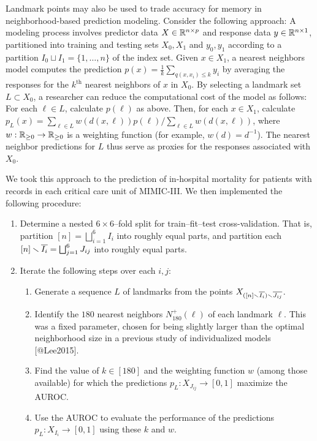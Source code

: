 \documentclass[
]{article}
\providecommand{\tightlist}{%
  \setlength{\itemsep}{0pt}\setlength{\parskip}{0pt}}
\begin{document}
Landmark points may also be used to trade accuracy for memory in
neighborhood-based prediction modeling. Consider the following approach:
A modeling process involves predictor data \(X \in \mathbb{R}^{n \times p}\) and
response data \(y \in \mathbb{R}^{n \times 1}\), partitioned into training and
testing sets \(X_0,X_1\) and \(y_0,y_1\) according to a partition
\(I_0 \sqcup I_1 = \{1,\ldots,n\}\) of the index set. Given
\(x \in X_1\), a nearest neighbors model computes the prediction
\(p(x) = \frac{1}{k}\sum_{q(x,x_i) \leq k}{y_i}\) by averaging the
responses for the \(k^\text{th}\) nearest neighbors of \(x\) in \(X_0\).
By selecting a landmark set \(L \subset X_0\), a researcher can reduce
the computational cost of the model as follows: For each \(\ell \in L\),
calculate \(p(\ell)\) as above. Then, for each \(x \in X_1\), calculate
\(p_L(x) = \sum_{\ell \in L}{w(d(x,\ell)) p(\ell)} / \sum_{\ell \in L}{w(d(x,\ell))}\),
where \(w : \mathbb{R}_{\geq 0} \to \mathbb{R}_{\geq 0}\) is a weighting function (for
example, \(w(d)=d^{-1}\)). The nearest neighbor predictions for \(L\)
thus serve as proxies for the responses associated with \(X_0\).

We took this approach to the prediction of in-hospital mortality for
patients with records in each critical care unit of MIMIC-III. We then
implemented the following procedure:

\begin{enumerate}
\def\labelenumi{\arabic{enumi}.}
\tightlist
\item
  Determine a nested \(6 \times 6\)--fold split for train--fit--test
  cross-validation. That is, partition
  \([n] = \bigsqcup_{i=1}^{6}{I_i}\) into roughly equal parts, and
  partition each \([n] \smallsetminus \overline{I_i} = \bigsqcup_{j=1}^{6}{J_{ij}}\) into
  roughly equal parts.
\item
  Iterate the following steps over each \(i,j\):

  \begin{enumerate}
  \def\labelenumii{\alph{enumii})}
  \tightlist
  \item
    Generate a sequence \(L\) of landmarks from the points
    \(X_{([n] \smallsetminus \overline{I_i}) \smallsetminus \overline{J_{ij}}}\).
  \item
    Identify the \(180\) nearest neighbors \(N^+_{180}(\ell)\) of each
    landmark \(\ell\). This was a fixed parameter, chosen for being
    slightly larger than the optimal neighborhood size in a previous
    study of individualized models {[}@Lee2015{]}.
  \item
    Find the value of \(k \in [180]\) and the weighting function \(w\)
    (among those available) for which the predictions
    \(p_L : X_{J_{ij}} \to [0,1]\) maximize the AUROC.
  \item
    Use the AUROC to evaluate the performance of the predictions
    \(p_L : X_{I_i} \to [0,1]\) using these \(k\) and \(w\).
  \end{enumerate}
\end{enumerate}
\end{document}
